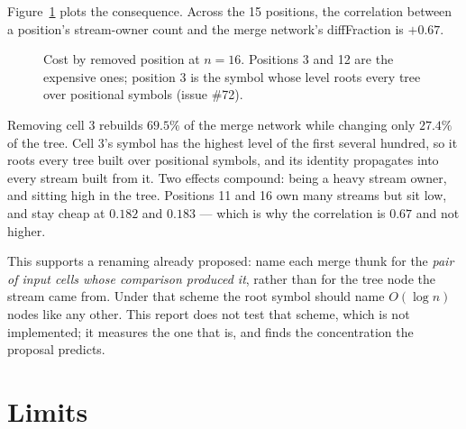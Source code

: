 \documentclass[11pt,a4paper]{article}
\begin{document}
Figure~\ref{fig:pos} plots the consequence. Across the 15 positions, the
correlation between a position's stream-owner count and the merge network's
diffFraction is $+0.67$.

\begin{figure}[htbp]
\centering
{}
\caption{Cost by removed position at $n=16$. Positions 3 and 12 are the
expensive ones; position 3 is the symbol whose level roots every tree over
positional symbols (issue \#72).}
\label{fig:pos}
\end{figure}

Removing cell 3 rebuilds $69.5\%$ of the merge network while changing only
$27.4\%$ of the tree. Cell 3's symbol has the highest level of the first
several hundred, so it roots every tree built over positional symbols, and its
identity propagates into every stream built from it. Two effects compound:
being a heavy stream owner, and sitting high in the tree. Positions 11 and 16
own many streams but sit low, and stay cheap at $0.182$ and $0.183$ --- which
is why the correlation is $0.67$ and not higher.

This supports a renaming already proposed: name each merge thunk for the
\emph{pair of input cells whose comparison produced it}, rather than for the
tree node the stream came from. Under that scheme the root symbol should name
$O(\log n)$ nodes like any other. This report does not test that scheme, which
is not implemented; it measures the one that is, and finds the concentration
the proposal predicts.

\section{Limits}
\end{document}
